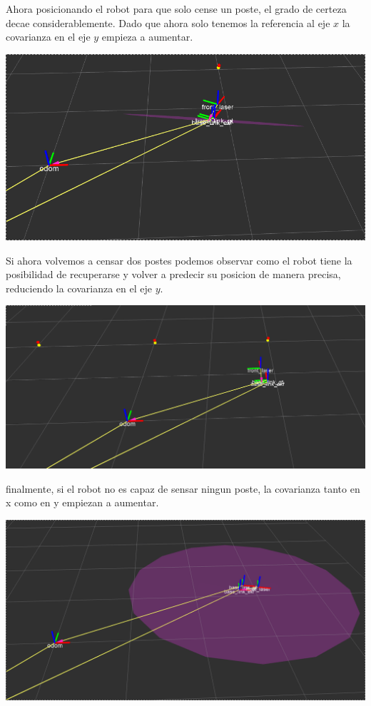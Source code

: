 Ahora posicionando el robot para que solo cense un poste, el grado de certeza decae considerablemente. Dado que ahora solo tenemos la referencia al eje $x$ la covarianza en el eje $y$ empieza a aumentar.

\includegraphics[scale=0.3]{punto4/ekfViendoUnPoste.png}

Si ahora volvemos a censar dos postes podemos observar como el robot tiene la posibilidad de recuperarse y volver a predecir su posicion de manera precisa, reduciendo la covarianza en el eje $y$.

\includegraphics[scale=0.3]{punto4/ekfViendoTresPostesOtraVez.png}

finalmente, si el robot no es capaz de sensar ningun poste, la covarianza tanto en x como en y empiezan a aumentar.

\includegraphics[scale=0.3]{punto4/ekfSinVerNingunPoste.png}


